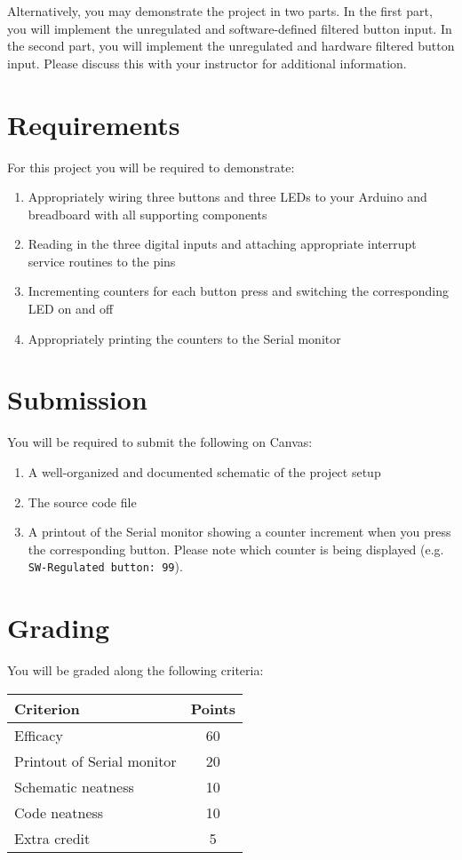 Alternatively, you may demonstrate the project in two parts. In the first part, you will implement the unregulated and software-defined filtered button input.
In the second part, you will implement the unregulated and hardware filtered button input.
Please discuss this with your instructor for additional information.


\section*{Requirements}
For this project you will be required to demonstrate:

\begin{enumerate}
    \item Appropriately wiring three buttons and three LEDs to your Arduino and breadboard with all supporting components
    \item Reading in the three digital inputs and attaching appropriate interrupt service routines to the pins
    \item Incrementing counters for each button press and switching the corresponding LED on and off
    \item Appropriately printing the counters to the Serial monitor
\end{enumerate}

\section*{Submission}
You will be required to submit the following on Canvas:
\begin{enumerate}
    \item A well-organized and documented schematic of the project setup
    \item The source code file
    \item A printout of the Serial monitor showing a counter increment when you press the corresponding button. Please note which counter is being displayed (e.g. \lstinline[]{SW-Regulated button: 99}).
\end{enumerate}

\section*{Grading}
You will be graded along the following criteria:

\begin{table*}[ht!]
    \begin{tabular}{ l | c }
        \toprule
        Criterion & Points \\

        \midrule
        Efficacy & 60 \\
        Printout of Serial monitor & 20 \\
        Schematic neatness & 10 \\
        Code neatness & 10 \\
        Extra credit & 5 \\

        \bottomrule
    \end{tabular}
\end{table*}

